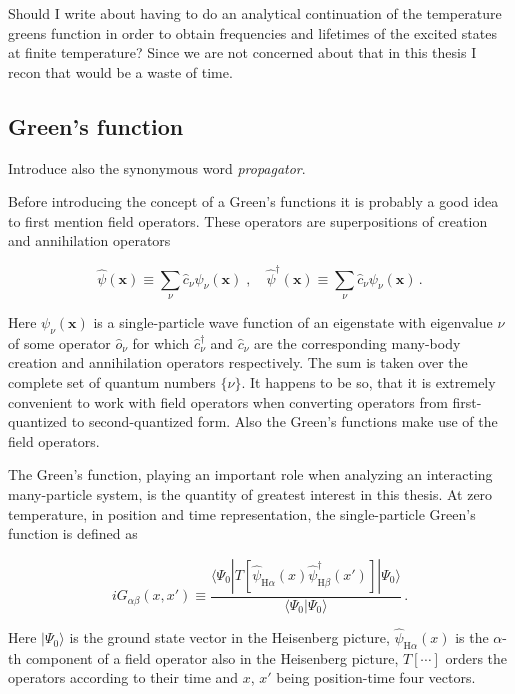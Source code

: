 \documentclass[12pt]{report}
\renewcommand{\vec}[1]{\boldsymbol{\mathbf{#1}}}                        %
\newcommand{\question}[1]{{\leavevmode\color{question}#1}}
\newcommand{\todo}[1]{{\leavevmode\color{todo}#1}}
\begin{document}
\question{Should I write about having to do an analytical continuation of the temperature greens function in order to obtain frequencies and lifetimes of the excited states at finite temperature? Since we are not concerned about that in this thesis I recon that would be a waste of time.}


\subsection{Green's function}

\todo{Introduce also the synonymous word \textit{propagator}.}

Before introducing the concept of a Green's functions it is probably a good idea to first mention field operators. These operators are superpositions of creation and annihilation operators

\begin{equation}
	\label{eq:fieldOperator}
	\hat \psi (\vec x) \equiv \sum_{\nu} \hat c_{\nu} \psi_{\nu}(\vec x)
	\; , \quad
	\hat \psi^\dagger (\vec x) \equiv \sum_{\nu} \hat c_{\nu} \psi_{\nu}(\vec x) \,.
\end{equation}

Here $ \psi_{\nu}(\vec x) $ is a single-particle wave function of an eigenstate with eigenvalue $ \nu $ of some operator $ \hat o_\nu $ for which $ \hat c^\dagger _\nu $ and $ \hat c _\nu $ are the corresponding many-body creation and annihilation operators respectively. The sum is taken over the complete set of quantum numbers $ \{ \nu \} $. It happens to be so, that it is extremely convenient to work with field operators when converting operators from first-quantized to second-quantized form. Also the Green's functions make use of the field operators.

The Green's function, playing an important role when analyzing an interacting many-particle system, is the quantity of greatest interest in this thesis. At zero temperature, in position and time representation, the single-particle Green's function is defined as

\begin{equation}
	i G_{\alpha \beta} (x, x')
	\equiv \frac{\langle \Psi_0 | T[\hat \psi_{\text{H} \alpha} (x) \hat \psi^\dagger_{\text{H} \beta} (x')] |\Psi_0 \rangle}{\langle \Psi_0 |\Psi_0 \rangle} \,.
\end{equation}

Here $ | \Psi_0 \rangle $ is the ground state vector in the Heisenberg picture, $ \hat \psi_{\text{H} \alpha}(x) $ is the $ \alpha $-th component of a field operator also in the Heisenberg picture, $ T[ \cdots ] $ orders the operators according to their time and $ x $, $ x' $ being position-time four vectors.
\end{document}
